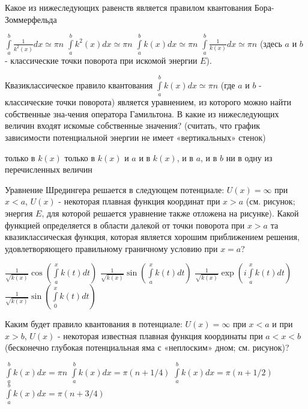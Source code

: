 \documentclass[11pt,a4paper]{exam}
\begin{document}
\begin{questions}
\question Какое из нижеследующих равенств является правилом квантования Бора-Зоммерфельда
\begin{choices}
\choice $\int\limits_a^b {\frac{1}{{{k^2}(x)}}dx \simeq \pi n} $ 
\choice $\int\limits_a^b {{k^2}(x)dx \simeq \pi n} $ 
\choice $\int\limits_a^b {k(x)dx \simeq \pi n} $  
\choice $\int\limits_a^b {\frac{1}{{k(x)}}dx \simeq \pi n} $
(здесь $a$ и $b$ - классические точки поворота при искомой энергии $E$).
\end{choices}

\question Квазиклассическое правило квантования $\int\limits_a^b {k(x)dx \simeq \pi n} $ (где $a$ и $b$ - классические точки поворота) является уравнением, из которого можно найти собственные зна-чения оператора Гамильтона. В какие из нижеследующих величин входят искомые собственные значения? (считать, что график зависимости потенциальной энергии не имеет «вертикальных» стенок)
\begin{choices}
\choice только в $k(x)$         
\choice только в $k(x)$ и $a$
\choice и в $k(x)$, и в $a$, и в $b$     
\choice ни в одну из перечисленных величин
\end{choices}

\question Уравнение Шредингера решается в следующем потенциале: $U(x) = \infty $ при $x < a$, $U(x)$ - некоторая плавная функция координат при $x > a$ (см. рисунок; энергия $E$, для которой решается уравнение также отложена на рисунке). Какой функцией определяется в области далекой от точки поворота при $x > a$ та квазиклассическая функция, которая является хорошим приближением решения, удовлетворяющего правильному граничному условию при $x = a$?
\begin{choices}
\choice $\frac{1}{{\sqrt {k(x)} }}\cos \left( {\int\limits_a^x {k(t)dt} } \right)$    
\choice $\frac{1}{{\sqrt {k(x)} }}\sin \left( {\int\limits_a^x {k(t)dt} } \right)$
\choice $\frac{1}{{\sqrt {k(x)} }}\exp \left( {i\int\limits_a^x {k(t)dt} } \right)$      
\choice $\frac{1}{{\sqrt {k(x)} }}\sin \left( {\int\limits_0^x {k(t)dt} } \right)$
\end{choices}

\question Каким будет правило квантования в потенциале: $U(x) = \infty $ при $x < a$ и при $x > b$, $U(x)$ - некоторая известная плавная функция координаты при $a < x < b$ (бесконечно глубокая потенциальная яма с «неплоским» дном; см. рисунок)?
\begin{choices}
\choice $\int\limits_a^b {k(x)dx = \pi n} $       
\choice $\int\limits_a^b {k(x)dx = \pi (n + 1/4)} $
\choice $\int\limits_a^b {k(x)dx = \pi (n + 1/2)} $     
\choice $\int\limits_a^b {k(x)dx = \pi (n + 3/4)} $
\end{choices}

\end{questions}
\end{document}
